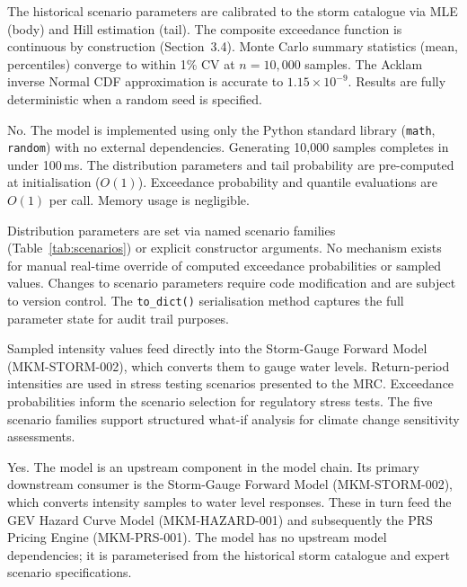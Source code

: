 \documentclass[11pt,a4paper]{article}
\begin{document}
The historical scenario parameters are calibrated to the storm catalogue via MLE (body) and Hill estimation (tail). The composite exceedance function is continuous by construction (Section~3.4). Monte Carlo summary statistics (mean, percentiles) converge to within 1\% CV at $n = 10{,}000$ samples. The Acklam inverse Normal CDF approximation is accurate to $1.15 \times 10^{-9}$. Results are fully deterministic when a random seed is specified.

No. The model is implemented using only the Python standard library (\texttt{math}, \texttt{random}) with no external dependencies. Generating 10,000 samples completes in under 100\,ms. The distribution parameters and tail probability are pre-computed at initialisation ($O(1)$). Exceedance probability and quantile evaluations are $O(1)$ per call. Memory usage is negligible.

Distribution parameters are set via named scenario families (Table~\ref{tab:scenarios}) or explicit constructor arguments. No mechanism exists for manual real-time override of computed exceedance probabilities or sampled values. Changes to scenario parameters require code modification and are subject to version control. The \texttt{to\_dict()} serialisation method captures the full parameter state for audit trail purposes.

Sampled intensity values feed directly into the Storm-Gauge Forward Model (MKM-STORM-002), which converts them to gauge water levels. Return-period intensities are used in stress testing scenarios presented to the MRC. Exceedance probabilities inform the scenario selection for regulatory stress tests. The five scenario families support structured what-if analysis for climate change sensitivity assessments.

Yes. The model is an upstream component in the model chain. Its primary downstream consumer is the Storm-Gauge Forward Model (MKM-STORM-002), which converts intensity samples to water level responses. These in turn feed the GEV Hazard Curve Model (MKM-HAZARD-001) and subsequently the PRS Pricing Engine (MKM-PRS-001). The model has no upstream model dependencies; it is parameterised from the historical storm catalogue and expert scenario specifications.
\end{document}
